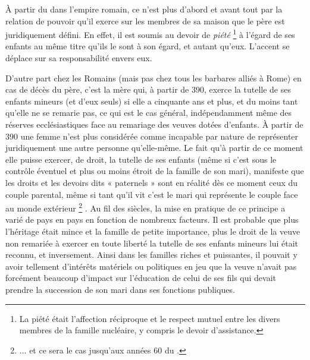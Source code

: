  À partir du  dans l'empire romain, ce n'est plus d'abord et avant tout par la relation de pouvoir qu'il exerce sur les membres de sa maison que le père est juridiquement défini. En effet, il est soumis au devoir de \emph{piété}%
\footnote{La piété était l'affection réciproque et le respect mutuel entre les divers membres de la famille nucléaire, y compris le devoir d'assistance.} 
à l'égard de ses enfants au même titre qu'ils le sont à son égard, et autant qu'eux. L'accent se déplace sur sa responsabilité envers eux. 

D'autre part chez les Romains (mais pas chez tous les barbares alliés à Rome) en cas de décès du père, c'est la mère qui, à partir de 390, exerce la tutelle de ses enfants mineurs (et d'eux seuls) si elle a cinquante ans et plus, et du moins tant qu'elle ne se remarie pas, ce qui est le cas général, indépendamment même des réserves ecclésiastiques face au remariage des veuves dotées d'enfants. À partir de 390 une femme n'est plus considérée comme incapable par nature de représenter juridiquement une autre personne qu'elle-même. Le fait qu'à partir de ce moment elle puisse exercer, de droit, la tutelle de ses enfants (même si c'est sous le contrôle éventuel et plus ou moins étroit de la famille de son mari), manifeste que les droits et les devoirs dits « paternels » sont en réalité dès ce moment ceux du couple parental, même si tant qu'il vit c'est le mari qui représente le couple face au monde extérieur%
\footnote{... et ce sera le cas jusqu'aux années 60 du .}%
. Au fil des siècles, la mise en pratique de ce principe a varié de pays en pays en fonction de nombreux facteurs. Il est probable que plus l'héritage était mince et la famille de petite importance, plus le droit de la veuve non remariée à exercer en toute liberté la tutelle de ses enfants mineurs lui était reconnu, et inversement. Ainsi dans les familles riches et puissantes, il pouvait y avoir tellement d'intérêts matériels ou politiques en jeu que la veuve n'avait pas forcément beaucoup d'impact sur l'éducation de celui de ses fils qui devait prendre la succession de son mari dans ses fonctions publiques. 

